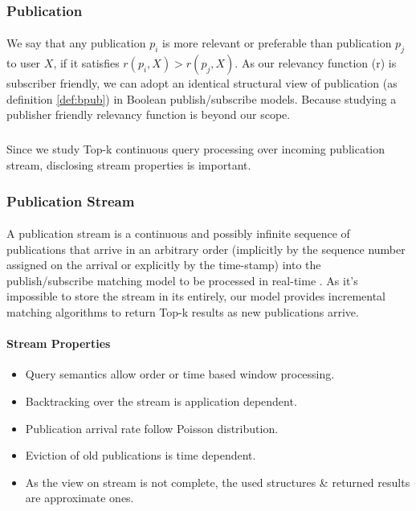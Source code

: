 \documentclass[a4paper,12pt,oneside]{book}
\theoremstyle{definition}
\theoremstyle{remark}
\begin{document}
\subsubsection{Publication}
\label{sec:pubprel}
\paragraph*{}
We say that any publication $p_i$ is more relevant or preferable than publication $p_j$ to user $X$, if it satisfies $r(p_i,X) > r(p_j,X)$. As our relevancy function (r) is subscriber friendly, we can adopt an identical structural view of publication (as definition \ref{def:bpub}) in Boolean publish/subscribe models. Because studying a publisher friendly relevancy function is beyond our scope.
\subparagraph*{}
Since we study Top-k continuous query processing over incoming publication stream, disclosing stream properties is important. 
\subsubsection{Publication Stream}
\label{sec:pubstream}
\paragraph*{}
A publication stream is a continuous and possibly infinite sequence of publications that arrive in an arbitrary order (implicitly by the sequence number assigned on the arrival or explicitly by the time-stamp) into the publish/subscribe matching model to be processed in real-time \cite{Golab2003}. As it's impossible to store the stream in its entirely, our model provides incremental matching algorithms to return Top-k results as new publications arrive.
\paragraph*{Stream Properties}
\begin{itemize}[label=$-$]
\item Query semantics allow order or time based window processing.
\item Backtracking over the stream is application dependent.
\item Publication arrival rate follow Poisson distribution.
\item Eviction of old publications is time dependent.
\item As the view on stream is not complete, the used structures \& returned results are approximate ones.
\end{itemize}
\end{document}
